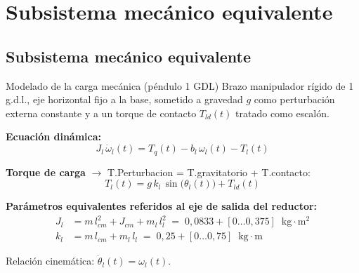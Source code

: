 \documentclass[aspectratio=169,t]{beamer}
\newcommand{\SecPresentacion}{Presentación del problema}
\newcommand{\SecMecanico}{Subsistema mecánico equivalente}
\newcommand{\SecElectromagnetico}{Subsistema electromagnético en coordenadas qd0}
\newcommand{\SecTermico}{Subsistema térmico}
\newcommand{\SecNLGlobal}{Sistema No Lineal Global}
\newcommand{\SecLPV}{Linealización Jacobiana (LPV)}
\newcommand{\SecLTI}{Obtención del modelo LTI equivalente}
\newcommand{\SecAnalisisLTI}{Análisis del modelo LTI aumentado}
\newcommand{\SecDinamica}{Respuesta dinámica en dominio del tiempo}
\newcommand{\SecControlador}{Diseño y análisis del controlador en cascada}
\newcommand{\SecVerifSpecs}{Verificación de desempeño: Especificaciones de operación}
\newcommand{\SecVerifOffset}{Verificación de desempeño: Offset de estado estacionario}
\newcommand{\SecVerifNoIdealidades}{Verificación de desempeño: No idealidades y comportamiento térmico}
\newcommand{\SecDiscretizacion}{Discretización del controlador}
\newcommand{\SecSoftware}{Codificación del software de control}
\newcommand{\AgendaItem}[3]{%
  \ifnum#1=#2
    {\scriptsize\bfseries\color{uncBlue}%
      \hyperlink{sec:#1}{\makebox[2.2em][r]{#1.}\hspace{0.7em}%
      \parbox[t]{0.86\textwidth}{#3}}\par}%
  \else
    {\scriptsize\color{black!26}%
      \hyperlink{sec:#1}{\makebox[2.2em][r]{#1.}\hspace{0.7em}%
      \parbox[t]{0.86\textwidth}{#3}}\par}%
  \fi
  \vspace{0.35mm}%
}
\newcommand{\AgendaBody}[1]{%
    \vspace{3mm}
    {\Large\bfseries\color{uncBlue}Tabla de contenidos\par}
    \vspace{2mm}
    \begin{minipage}{0.94\textwidth}
      \AgendaItem{1}{#1}{\SecPresentacion}
      \AgendaItem{2}{#1}{\SecMecanico}
      \AgendaItem{3}{#1}{\SecElectromagnetico}
      \AgendaItem{4}{#1}{\SecTermico}
      \AgendaItem{5}{#1}\SecNLGlobal
      \AgendaItem{6}{#1}{\SecLPV}
      \AgendaItem{7}{#1}{\SecLTI}
      \AgendaItem{8}{#1}{\SecAnalisisLTI}
      \AgendaItem{9}{#1}{\SecDinamica}
      \AgendaItem{10}{#1}{\SecControlador}
      \AgendaItem{11}{#1}{\SecVerifSpecs}
      \AgendaItem{12}{#1}{\SecVerifOffset}
      \AgendaItem{13}{#1}{\SecVerifNoIdealidades}
      \AgendaItem{14}{#1}{\SecDiscretizacion}
      \AgendaItem{15}{#1}{\SecSoftware}
    \end{minipage}
    \vfill
}
\newcommand{\AgendaSlideTarget}[2]{%
  \begin{frame}[plain]
    \hypertarget{#2}{}%
    \AgendaBody{#1}
  \end{frame}
}
\newcommand{\StartProjectSection}[2]{%
  \section{#2}%
  \subsection{#2}%
  \AgendaSlideTarget{#1}{sec:#1}%
}
\begin{document}

\StartProjectSection{2}{\SecMecanico}

\begin{frame}{Modelado de la carga mecánica (péndulo 1 GDL)}
{\small\color{uncGray}Brazo manipulador rígido de 1 g.d.l., eje horizontal fijo a la base, sometido a gravedad $g$ como perturbación externa constante y a un torque de contacto $T_{ld}(t)$ tratado como escalón.}\par
\vspace{3mm}

\textbf{Ecuación dinámica:}
\begin{equation*}
J_l\,\dot{\omega}_l(t) = T_q(t) - b_l\,\omega_l(t) - T_l(t)
\end{equation*}

\textbf{Torque de carga} $\rightarrow$ T.Perturbacion = T.gravitatorio + T.contacto:
\begin{equation*}
T_l(t) = g\,k_l\,\sin\!\big(\theta_l(t)\big) + T_{ld}(t)
\end{equation*}

\textbf{Parámetros equivalentes referidos al eje de salida del reductor:}
\begin{align*}
J_l &= m\,l_{cm}^2 + J_{cm} + m_l\,l_l^2 \;=\; 0{,}0833 + [0\dots 0{,}375]\;\;\text{kg}\cdot\text{m}^2 \\
k_l &= m\,l_{cm} + m_l\,l_l \;=\; 0{,}25 + [0\dots 0{,}75]\;\;\text{kg}\cdot\text{m}
\end{align*}

\vspace{1mm}
{\small Relación cinemática: $\dot{\theta}_l(t)=\omega_l(t)$.}
\end{frame}
\end{document}
